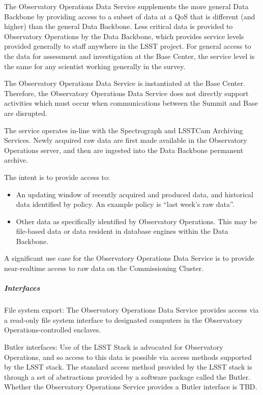 The Observatory Operations Data Service supplements the more general Data
Backbone by providing access to a subset of data at a QoS that is
different (and higher) than the general Data Backbone.  Less critical
data is provided to Observatory Operations by the Data Backbone, which
provides service levels provided generally to staff anywhere in the
LSST project. For general access to the data for assessment and
investigation at the Base Center, the service level is the same for any
scientist working generally in the survey.

The Observatory Operations Data Service is instantiated at the Base
Center. Therefore, the Observatory Operations Data Service does not
directly support activities which must occur when communications
between the Summit and Base are disrupted.

The service operates in-line with the Spectrograph and LSSTCam Archiving
Services. Newly acquired raw data are first made available in the Observatory
Operations server, and then are ingested into the Data Backbone permanent archive.

The intent is to provide access to:

\begin{itemize}

\item An updating window of recently acquired and produced data, and
historical data identified by policy. An example policy is ``last week’s raw data''.

\item Other data as specifically identified  by Observatory Operations.
This may be file-based data or data resident in database engines within
the Data Backbone.

\end{itemize}

A significant use case for the Observatory Operations Data Service is to
provide near-realtime access to raw data on the Commissioning Cluster.

\subparagraph{Interfaces}

File system export: The Observatory Operations Data Service provides access
via a read-only file system interface to designated computers in the
Observatory Operations-controlled enclaves.

Butler interfaces: Use of the LSST Stack is advocated for Observatory Operations,
and so access to this data is possible via access methods supported by the LSST stack.
The standard access method provided by the LSST stack is through a set of
abstractions provided by a software package called the Butler. Whether the Observatory
Operations Service provides a Butler interface is TBD.

